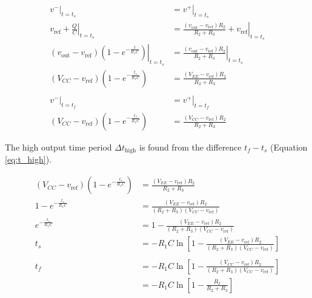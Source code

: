 \documentclass[12pt]{article}
\begin{document}
\begin{align}
\left. v^- \right|_{t=t_s} &= \left. v^+ \right|_{t=t_s}\nonumber\\
\left. v_\text{ref} + \frac{Q}{C} \right|_{t=t_s} &= \left. \frac{\left(v_\text{out} - v_\text{ref}\right)R_2}{R_2 + R_3} + v_\text{ref} \right|_{t=t_s}\nonumber\\
\left. \left( v_\text{out} - v_\text{ref} \right)\left( 1 - e^{-\frac{t}{R_1C}} \right) \right|_{t=t_s} &= \left. \frac{\left(v_\text{out} - v_\text{ref}\right)R_2}{R_2 + R_3} \right|_{t=t_s}\nonumber\\
\label{eq:high_t_start}
\left( V_{CC} - v_\text{ref} \right)\left( 1 - e^{-\frac{t_s}{R_1C}} \right) &= \frac{\left(V_{EE} - v_\text{ref}\right)R_2}{R_2 + R_3}\\
\nonumber\\
\left. v^- \right|_{t=t_f} &= \left. v^+ \right|_{t=t_f}\nonumber\\
\label{eq:high_t_finish}
\left( V_{CC} - v_\text{ref} \right)\left( 1 - e^{-\frac{t_f}{R_1C}} \right) &= \frac{\left(V_{CC} - v_\text{ref}\right)R_2}{R_2 + R_3}
\end{align}

\noindent
The high output time period $\Delta t_\text{high}$ is found from the difference $t_f - t_s$ (Equation \ref{eq:t_high}).

\begin{align}
\left( V_{CC} - v_\text{ref} \right)\left( 1 - e^{-\frac{t_s}{R_1C}} \right) &= \frac{\left(V_{EE} - v_\text{ref}\right)R_2}{R_2 + R_3}\nonumber\\
1 - e^{-\frac{t_s}{R_1C}} &= \frac{\left(V_{EE} - v_\text{ref}\right)R_2}{\left(R_2 + R_3\right)\left( V_{CC} - v_\text{ref} \right)}\nonumber\\
e^{-\frac{t_s}{R_1C}} &= 1 - \frac{\left(V_{EE} - v_\text{ref}\right)R_2}{\left(R_2 + R_3\right)\left( V_{CC} - v_\text{ref} \right)}\nonumber\\
t_s &= - R_1C \ln \left[1 - \frac{\left(V_{EE} - v_\text{ref}\right)R_2}{\left(R_2 + R_3\right)\left( V_{CC} - v_\text{ref} \right)}\right]\nonumber\\
\nonumber\\
t_f &= - R_1C \ln \left[1 - \frac{\left(V_{CC} - v_\text{ref}\right)R_2}{\left(R_2 + R_3\right)\left( V_{CC} - v_\text{ref} \right)}\right]\nonumber\\
    &= - R_1C \ln \left[1 - \frac{R_2}{R_2 + R_3}\right]\nonumber
\end{align}
\end{document}
